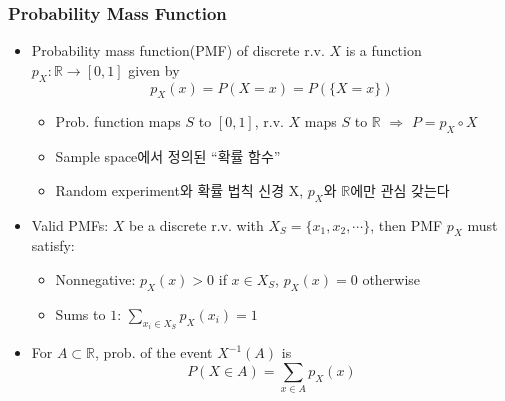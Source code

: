 \subsubsection*{Probability Mass Function}
\begin{itemize}
    \item Probability mass function(PMF) of discrete r.v. $X$ is a function $p_X:\mathbb{R}\to[0,1]$ given by
    \begin{equation}
        p_X(x)=P(X=x)=P(\{X=x\})
    \end{equation}
    \begin{itemize}
        \item Prob. function maps $S$ to $[0,1]$, r.v. $X$ maps $S$ to $\mathbb{R}$ $\Rightarrow$ $P=p_X\circ X$
        \item Sample space에서 정의된 ``확률 함수''
        \item Random experiment와 확률 법칙 신경 X, $p_X$와 $\mathbb{R}$에만 관심 갖는다
    \end{itemize}
    \item Valid PMFs: $X$ be a discrete r.v. with $X_S=\{x_1,x_2,\cdots\}$, then PMF $p_X$ must satisfy:
    \begin{itemize}
        \item Nonnegative: $p_X(x)>0$ if $x\in X_S$, $p_X(x)=0$ otherwise
        \item Sums to $1$: $\sum_{x_i\in X_S}p_X(x_i)=1$
    \end{itemize}
    \item For $A\subset\mathbb{R}$, prob. of the event $X^{-1}(A)$ is
    \begin{equation}\label{eq:prp:discrete-pmf-subset}
        P(X\in A)=\sum_{x\in A}p_X(x)
    \end{equation}
\end{itemize}

